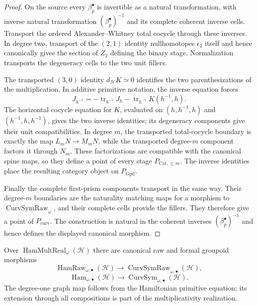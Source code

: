 \begin{proof}
On the source every $\beta_p^\bullet$ is invertible as a natural transformation,
with inverse natural transformation $(\beta_p^\bullet)^{-1}$ and its complete
coherent inverse cells.  Transport the ordered Alexander--Whitney total cocycle
through these inverses.  In degree two, transport of the $(2,1)$ identity
nullhomotopes $\epsilon_2$ itself and hence canonically gives the section of
$Z_2$ defining the binary stage.  Normalization transports the degeneracy cells
to the two unit fillers.

The transported $(3,0)$ identity $d_{\mathcal H}K\simeq0$ identifies the two
parenthesizations of the multiplication.  In additive primitive notation, the
inverse equation forces
\[
J_{h^{-1}}
=
-\operatorname{tr}_{h^{-1}}J_h
-\operatorname{tr}_{h^{-1}}K(h^{-1},h).
\]
The horizontal cocycle equation for $K$, evaluated on
$(h,h^{-1},h)$ and $(h^{-1},h,h^{-1})$, gives the two inverse identities; its
degeneracy components give their unit compatibilities.  In degree $m$, the
transported total-cocycle boundary is exactly the map
$L_mN\to M_mN$, while the transported degree-$m$ component factors it through
$N_m$.  These factorizations are compatible with the canonical spine maps, so
they define a point of every stage $P_{\mathrm{Cat},\le m}$.  The inverse
identities place the resulting category object on $P_{\mathrm{Gpd}}$.

Finally the complete first-prism components transport in the same way.  Their
degree-$m$ boundaries are the naturality matching maps for a morphism to
$\operatorname{CurvSymRaw}_{\omega}$, and their complete cells provide the
fillers.  They therefore give a point of $P_{\mathrm{curv}}$.  The construction
is natural in the coherent inverses $(\beta_p^\bullet)^{-1}$ and hence defines
the displayed canonical morphism.
\end{proof}

\begin{theorem}
\label{thm:prequantum-hamiltonian-implies-curvature-symmetry}
Over $\operatorname{HamMultReal}_{\omega}(\mathcal H)$ there are canonical raw
and formal groupoid morphisms
\[
\boxed{
\operatorname{HamRaw}_{\omega,\bullet}(\mathcal H)
\longrightarrow
\operatorname{CurvSymRaw}_{\omega,\bullet}(\mathcal H),
}
\]
\[
\boxed{
\operatorname{Ham}_{\omega,\bullet}(\mathcal H)
\longrightarrow
\operatorname{CurvSym}_{\omega,\bullet}(\mathcal H).
}
\]
The degree-one graph map follows from the Hamiltonian primitive equation; its
extension through all compositions is part of the multiplicativity realization.
\end{theorem}

